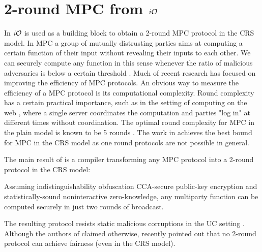 \section{2-round MPC from $i\mathcal{O}$}
\label{sec:iO-mpc}

In \cite{MPC-iO} $i\mathcal{O}$ is used as a building block to obtain a 2-round MPC protocol in the CRS model. In MPC a group of mutually distrusting parties aims at computing a certain function of their input without revealing their inputs to each other. We can securely compute any function in this sense whenever the ratio of malicious adversaries is below a certain threshold \cite{}. %
Much of recent research has focused on improving the efficiency of MPC protocols. An obvious way to measure the efficiency of a MPC protocol is its computational complexity. Round complexity has a certain practical importance, such as in the setting of computing on the web \cite{}, %
where a single server coordinates the computation and parties "log in" at different times without coordination.
The optimal round complexity for MPC in the plain model is known to be 5 rounds \cite{katz2004round}. The work in \cite{MPC-iO} achieves the best bound for MPC in the CRS model as one round protocols are not possible in general.

The main result of \cite{MPC-iO} is a compiler transforming any MPC protocol into a 2-round protocol in the CRS model: %
\begin{myinformaltheorem}
	Assuming indistinguishability obfuscation CCA-secure public-key encryption and statistically-sound noninteractive zero-knowledge, any multiparty function can be computed securely in just two rounds of broadcast.
\end{myinformaltheorem}


The resulting protocol resists static malicious corruptions in the UC setting \cite{canetti2001universally}.
Although the authors of \cite{MPC-iO} claimed otherwise, \cite{gordon2015constant} recently pointed out that no 2-round protocol can achieve fairness (even in the CRS model).







\begin{comment}
What to say: (see notepad)
- 
\end{comment}


